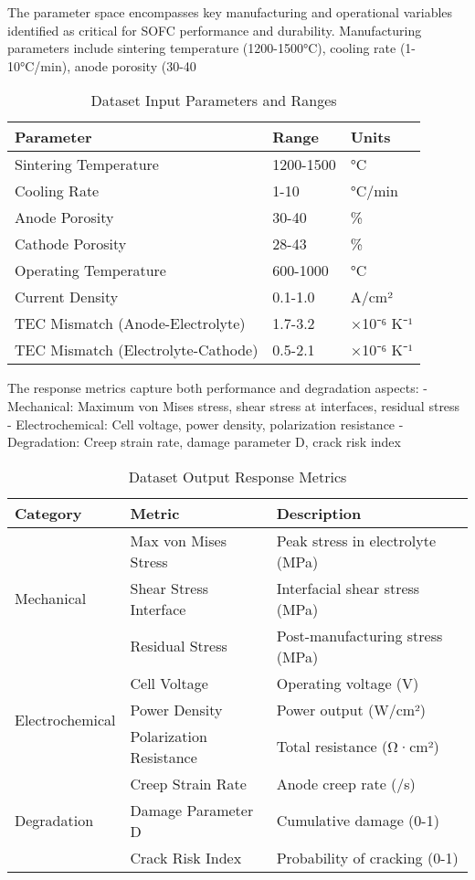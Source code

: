 \documentclass[10pt,conference]{IEEEtran}
\begin{document}
The parameter space encompasses key manufacturing and operational variables identified as critical for SOFC performance and durability. Manufacturing parameters include sintering temperature (1200-1500°C), cooling rate (1-10°C/min), anode porosity (30-40%

\begin{table}[H]
\centering
\caption{Dataset Input Parameters and Ranges}
\label{tab:input_params}
\begin{tabular}{@{}lll@{}}
\toprule
Parameter & Range & Units \\
\midrule
Sintering Temperature & 1200-1500 & °C \\
Cooling Rate & 1-10 & °C/min \\
Anode Porosity & 30-40 & \% \\
Cathode Porosity & 28-43 & \% \\
Operating Temperature & 600-1000 & °C \\
Current Density & 0.1-1.0 & A/cm² \\
TEC Mismatch (Anode-Electrolyte) & 1.7-3.2 & ×10⁻⁶ K⁻¹ \\
TEC Mismatch (Electrolyte-Cathode) & 0.5-2.1 & ×10⁻⁶ K⁻¹ \\
\bottomrule
\end{tabular}
\end{table}

The response metrics capture both performance and degradation aspects:
- Mechanical: Maximum von Mises stress, shear stress at interfaces, residual stress
- Electrochemical: Cell voltage, power density, polarization resistance
- Degradation: Creep strain rate, damage parameter D, crack risk index

\begin{table}[H]
\centering
\caption{Dataset Output Response Metrics}
\label{tab:output_metrics}
\begin{tabular}{@{}lll@{}}
\toprule
Category & Metric & Description \\
\midrule
\multirow{3}{*}{Mechanical} & Max von Mises Stress & Peak stress in electrolyte (MPa) \\
& Shear Stress Interface & Interfacial shear stress (MPa) \\
& Residual Stress & Post-manufacturing stress (MPa) \\
\midrule
\multirow{3}{*}{Electrochemical} & Cell Voltage & Operating voltage (V) \\
& Power Density & Power output (W/cm²) \\
& Polarization Resistance & Total resistance (Ω·cm²) \\
\midrule
\multirow{3}{*}{Degradation} & Creep Strain Rate & Anode creep rate (/s) \\
& Damage Parameter D & Cumulative damage (0-1) \\
& Crack Risk Index & Probability of cracking (0-1) \\
\bottomrule
\end{tabular}
\end{table}
\end{document}
